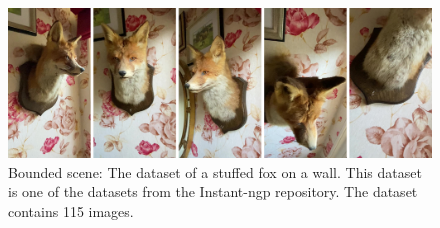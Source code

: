 \begin{figure}[h]
    \centering
    \includegraphics[width=1.0\textwidth]{figures/fox-dataset.png}
    \caption{Bounded scene: The dataset of a stuffed fox on a wall. This dataset is one of the datasets from the Instant-ngp repository. The dataset contains 115 images.}
    \label{fig:fox-dataset}
\end{figure}